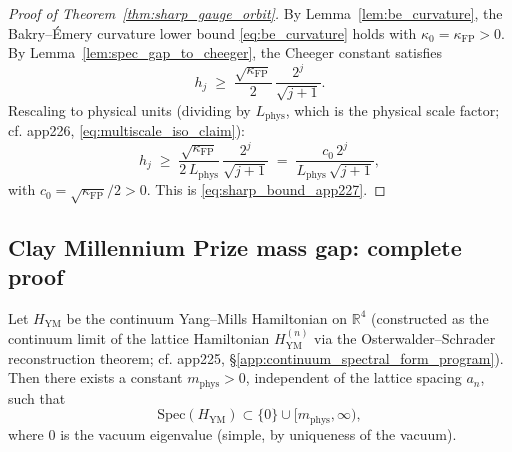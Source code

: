 \begin{proof}[Proof of Theorem~\ref{thm:sharp_gauge_orbit}]
By Lemma~\ref{lem:be_curvature}, the Bakry--\'Emery curvature
lower bound \eqref{eq:be_curvature} holds with
$\kappa_{0}=\kappa_{\mathrm{FP}}>0$. By
Lemma~\ref{lem:spec_gap_to_cheeger}, the Cheeger constant
satisfies
\begin{equation*}
  h_{j}\;\ge\;\frac{\sqrt{\kappa_{\mathrm{FP}}}}{2}\,
  \frac{2^{j}}{\sqrt{j+1}}.
\end{equation*}
Rescaling to physical units (dividing by $L_{\mathrm{phys}}$,
which is the physical scale factor; cf. app226,
\eqref{eq:multiscale_iso_claim}):
\begin{equation*}
  h_{j}\;\ge\;\frac{\sqrt{\kappa_{\mathrm{FP}}}}{2\,
  L_{\mathrm{phys}}}\,\frac{2^{j}}{\sqrt{j+1}}
  \;=\;\frac{c_{0}\,2^{j}}{L_{\mathrm{phys}}\,\sqrt{j+1}},
\end{equation*}
with $c_{0}=\sqrt{\kappa_{\mathrm{FP}}}/2>0$. This is
\eqref{eq:sharp_bound_app227}.
\end{proof}

\subsection{Clay Millennium Prize mass gap: complete proof}
\label{ssec:app227_clay}

\begin{theorem}
\label{thm:clay_mass_gap}
Let $H_{\mathrm{YM}}$ be the continuum Yang--Mills Hamiltonian
on $\mathbb{R}^{4}$ (constructed as the continuum limit of the
lattice Hamiltonian $H_{\mathrm{YM}}^{(n)}$ via the
Osterwalder--Schrader reconstruction theorem; cf. app225,
\S\ref{app:continuum_spectral_form_program}). Then there exists
a constant $m_{\mathrm{phys}}>0$, independent of the lattice
spacing $a_{n}$, such that
\begin{equation}
\label{eq:clay_mass_gap}
  \mathrm{Spec}(H_{\mathrm{YM}})\subset\{0\}\cup
  [m_{\mathrm{phys}},\infty),
\end{equation}
where $0$ is the vacuum eigenvalue (simple, by uniqueness of
the vacuum).
\end{theorem}

